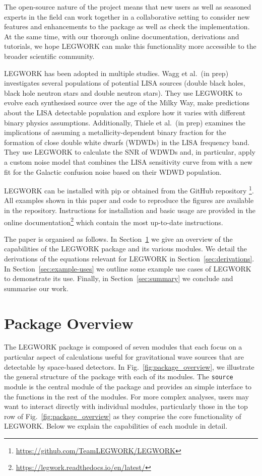 \documentclass[twocolumn]{aastex631}
\newcommand{\lw}{LEGWORK}
\begin{document}
The open-source nature of the project means that new users as well as seasoned experts in the field can work together in a collaborative setting to consider new features and enhancements to the package as well as check the implementation. At the same time, with our thorough online documentation, derivations and tutorials, we hope \lw{} can make this functionality more accessible to the broader scientific community.

\lw{} has been adopted in multiple studies. Wagg et al.\ (in prep) investigates several populations of potential LISA sources (double black holes, black hole neutron stars and double neutron stars). They use \lw{} to evolve each synthesised source over the age of the Milky Way, make predictions about the LISA detectable population and explore how it varies with different binary physics assumptions. Additionally, Thiele et al.\ (in prep) examines the implications of assuming a metallicity-dependent binary fraction for the formation of close double white dwarfs (WDWDs) in the LISA frequency band. They use \lw{} to calculate the SNR of WDWDs and, in particular, apply a custom noise model that combines the LISA sensitivity curve from \citet{Robson+2019} with a new fit for the Galactic confusion noise based on their WDWD population.

\lw{} can be installed with pip or obtained from the GitHub repository \href{https://github.com/TeamLEGWORK/LEGWORK}{\faGithub}\footnote{\url{https://github.com/TeamLEGWORK/LEGWORK}}. All examples shown in this paper and code to reproduce the figures are available in the repository. Instructions for installation and basic usage are provided in the online documentation\footnote{\url{https://legwork.readthedocs.io/en/latest/}} which contain the most up-to-date instructions.

The paper is organised as follows. In Section~\ref{sec:LEGWORK-overview} we give an overview of the capabilities of the \lw{} package and its various modules. We detail the derivations of the equations relevant for \lw{} in Section~\ref{sec:derivations}. In Section~\ref{sec:example-uses} we outline some example use cases of \lw{} to demonstrate its use. Finally, in Section~\ref{sec:summary} we conclude and summarise our work.

\section{Package Overview}\label{sec:LEGWORK-overview}

The \lw{} package is composed of seven modules that each focus on a particular aspect of calculations useful for gravitational wave sources that are detectable by space-based detectors. In Fig.~\ref{fig:package_overview}, we illustrate the general structure of the package with each of its modules. The \texttt{source} module is the central module of the package and provides an simple interface to the functions in the rest of the modules. For more complex analyses, users may want to interact directly with individual modules, particularly those in the top row of Fig.~\ref{fig:package_overview} as they comprise the core functionality of \lw{}. Below we explain the capabilities of each module in detail.
\end{document}
